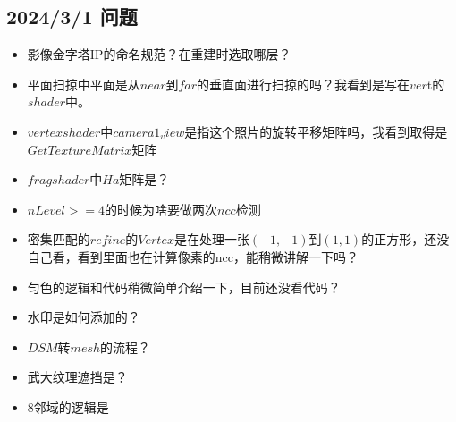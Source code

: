 \subsection{2024/3/1 问题}
\begin{itemize}
	\item 影像金字塔IP的命名规范？在重建时选取哪层？
	\item 平面扫掠中平面是从$near$到$far$的垂直面进行扫掠的吗？我看到是写在$ver$t的$shader$中。
	\item $vertexshader$中$camera1_view$是指这个照片的旋转平移矩阵吗，我看到取得是$GetTextureMatrix$矩阵
	\item $frag shader$中$Ha$矩阵是？
	\item $nLevel >= 4$的时候为啥要做两次$ncc$检测
	\item 密集匹配的$refine$的$Vertex$是在处理一张$(-1, -1)$到$(1, 1)$的正方形，还没自己看，看到里面也在计算像素的ncc，能稍微讲解一下吗？
	\item 匀色的逻辑和代码稍微简单介绍一下，目前还没看代码？
	\item 水印是如何添加的？
	\item $DSM$转$mesh$的流程？
	\item 武大纹理遮挡是？
	\item 8邻域的逻辑是
\end{itemize}